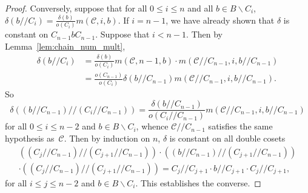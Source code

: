\documentclass[ALCO,ThmDefs,Unicode,epreuves]{cedram}
\begin{document}
\begin{proof}
Conversely, suppose that for all $0 \leq i \leq n$ and all $b \in
B\backslash C_i$, $\delta(b//C_i) =
\frac{\delta(b)}{o(C_i)}m(\mathcal{C}, i, b)$. If $i = n-1$, we have
already shown that $\delta$ is constant on $C_{n-1}bC_{n-1}$. Suppose
that $i < n-1$. Then by Lemma~\ref{lem:chain_num_mult}, 
\[
\begin{aligned}
\delta(b//C_i) &= \frac{\delta(b)}{o(C_i)}m(\mathcal{C}, n-1, b) \cdot
m(\mathcal{C}//C_{n-1}, i, b//C_{n-1})
\\
 &= \frac{o(C_{n-1})}{o(C_i)}\delta(b//C_{n-1})m(\mathcal{C}//C_{n-1},
i, b//C_{n-1}).
\end{aligned}
\]
So 
\[
\delta\left((b//C_{n-1})//(C_i//C_{n-1})\right) =
\frac{\delta(b//C_{n-1})}{o(C_i//C_{n-1})}m(\mathcal{C}//C_{n-1}, i,
b//C_{n-1})
\] 
for all $0 \leq i \leq n-2$ and $b \in B\backslash C_i$, whence
$\mathcal{C}//C_{n-1}$ satisfies the same hypothesis as~$\mathcal{C}$.
Then by induction on $n$, $\delta$ is constant on all double cosets
\begin{multline*}
\left((C_j//C_{n-1})//(C_{j+1}//C_{n-1})\right)\cdot
\left((b//C_{n-1})//(C_{j+1}//C_{n-1})\right)
\\
 \cdot
\left((C_j//C_{n-1})//(C_{j+1}//C_{n-1})\right) = C_j//C_{j+1} \cdot
b//C_{j+1}\cdot C_j//C_{j+1},
\end{multline*} 
for all $i \leq j \leq n-2$ and $b \in
B\backslash C_i$. This establishes the converse. 
 \end{proof}
\end{document}
